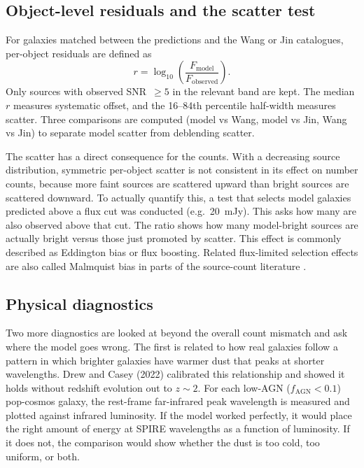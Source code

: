 \documentclass[12pt,a4paper]{article}
\begin{document}
\subsection{Object-level residuals and the scatter test}
\label{sec:methods:scatter}

For galaxies matched between the \popcosmos{} predictions and the Wang or Jin
catalogues, per-object residuals are defined as
\begin{equation}
  r = \log_{10}\!\left(\frac{F_\mathrm{model}}{F_\mathrm{observed}}\right).
\end{equation}
Only sources with observed SNR~$\geq 5$ in the relevant band are kept. The median
$r$ measures systematic offset, and the 16--84th percentile half-width measures
scatter. Three comparisons are computed (model vs Wang, model vs Jin, Wang vs
Jin) to separate model scatter from deblending scatter.

The scatter has a direct consequence for the counts. With a decreasing source
distribution, symmetric per-object scatter is not consistent in its effect on number
counts, because more faint sources are scattered upward than bright sources are
scattered downward. To actually quantify this, a test that selects model galaxies
predicted above a flux cut was conducted (e.g.\ \SI{20}{mJy}). This asks how many are also observed
above that cut. The ratio shows how many model-bright sources are actually bright
versus those just promoted by scatter. This effect is commonly described as
Eddington bias or flux boosting. Related flux-limited selection effects are also called
Malmquist bias in parts of the source-count literature \citep{Clements_1999}.

\subsection{Physical diagnostics}
\label{sec:methods:diagnostics}
Two more diagnostics are looked at beyond the overall count mismatch and ask where the model goes wrong. The first is related to how real galaxies follow a pattern in which brighter galaxies have warmer dust that peaks at shorter wavelengths. Drew and Casey (2022) calibrated this relationship and showed it holds without redshift evolution out to $z \sim 2$. For each low-AGN ($f_\mathrm{AGN} < 0.1$) pop-cosmos galaxy, the rest-frame far-infrared peak wavelength is measured and plotted against infrared luminosity. If the model worked perfectly, it would place the right amount of energy at SPIRE wavelengths as a function of luminosity. If it does not, the comparison would show whether the dust is too cold, too uniform, or both.
\end{document}
